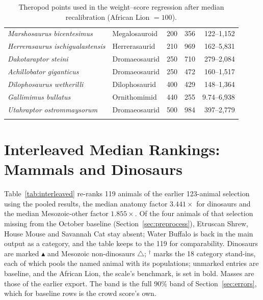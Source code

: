 \documentclass[11pt]{article}
\begin{document}
\begin{longtable}{llrrr}
\textit{Marshosaurus bicentesimus} & Megalosauroid & 200 & 356 & 122--1,152 \\
\textit{Herrerasaurus ischigualastensis} & Herrerasaurid & 210 & 969 & 162--5,831 \\
\textit{Dakotaraptor steini} & Dromaeosaurid & 250 & 710 & 279--2,084 \\
\textit{Achillobator giganticus} & Dromaeosaurid & 250 & 472 & 160--1,517 \\
\textit{Dilophosaurus wetherilli} & Dilophosaurid & 400 & 429 & 148--1,364 \\
\textit{Gallimimus bullatus} & Ornithomimid & 440 & 255 & 9.74--6,938 \\
\textit{Utahraptor ostrommaysorum} & Dromaeosaurid & 500 & 984 & 397--2,779 \\
\bottomrule
\caption{Theropod points used in the weight--score regression after median recalibration (African Lion $=100$).}
\label{tab:theropod_weights}
\end{longtable}
\normalsize

\newpage
\section{Interleaved Median Rankings: Mammals and Dinosaurs}
\label{app:interleaved}

Table~\ref{tab:interleaved} re-ranks 119 animals of the earlier 123-animal selection using the pooled results, the median anatomy factor $3.441\times$ for dinosaurs and the median Mesozoic-other factor $1.855\times$. Of the four animals of that selection missing from the October baseline (Section~\ref{sec:preprocess}), Etruscan Shrew, House Mouse and Savannah Cat stay absent; Water Buffalo is back in the main output as a category, and the table keeps to the 119 for comparability. Dinosaurs are marked $\blacktriangle$ and Mesozoic non-dinosaurs $\triangle$; $^{\dagger}$ marks the 18 category stand-ins, each of which pools the named animal with its populations; unmarked entries are baseline, and the African Lion, the scale's benchmark, is set in bold. Masses are those of the earlier export. The band is the full 90\% band of Section~\ref{sec:errors}, which for baseline rows is the crowd score's own.
\end{document}
